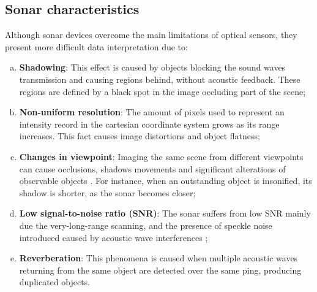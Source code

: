 \documentclass[final,5p,times]{elsarticle}
\begin{document}

\subsection{Sonar characteristics}
\label{sonar:characteristics}

Although sonar devices overcome the main limitations of optical sensors, they present more difficult data interpretation due to:

\begin{enumerate}[(a)]
    \item \textbf{Shadowing}: This effect is caused by objects blocking the sound waves transmission and causing regions behind, without acoustic feedback. These regions are defined by a black spot in the image occluding part of the scene;
    \item \textbf{Non-uniform resolution}: The amount of pixels used to represent an intensity record in the cartesian coordinate system grows as its range increases. This fact causes image distortions and object flatness;
    \item \textbf{Changes in viewpoint}: Imaging the same scene from different viewpoints can cause occlusions, shadows movements and significant alterations of observable objects \cite{hurtos2014}. For instance, when an outstanding object is insonified, its shadow is shorter, as the sonar becomes closer;
    \item \textbf{Low signal-to-noise ratio (SNR)}: The sonar suffers from low SNR mainly due the very-long-range scanning, and the presence of speckle noise introduced caused by acoustic wave interferences \cite{abbott1979};
    \item \textbf{Reverberation}: This phenomena is caused when multiple acoustic waves returning from the same object are detected over the same ping, producing duplicated objects.
\end{enumerate}
\end{document}
